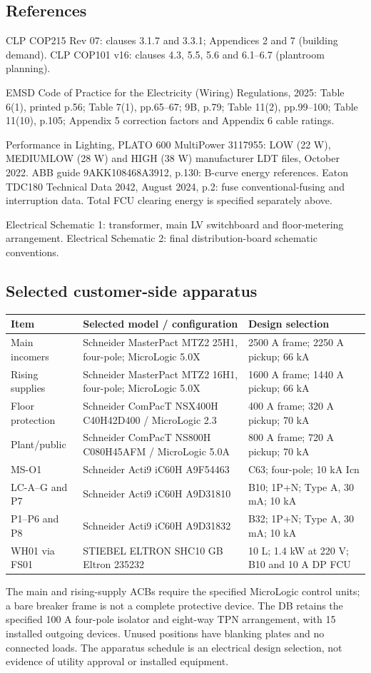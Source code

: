 \subsection*{References}
CLP COP215 Rev 07: clauses 3.1.7 and 3.3.1; Appendices 2 and 7 (building demand). CLP COP101 v16: clauses 4.3, 5.5, 5.6 and 6.1--6.7 (plantroom planning).

EMSD Code of Practice for the Electricity (Wiring) Regulations, 2025: Table 6(1), printed p.56; Table 7(1), pp.65--67; 9B, p.79; Table 11(2), pp.99--100; Table 11(10), p.105; Appendix 5 correction factors and Appendix 6 cable ratings.

Performance in Lighting, PLATO 600 MultiPower 3117955: LOW (22 W), MEDIUMLOW (28 W) and HIGH (38 W) manufacturer LDT files, October 2022. ABB guide 9AKK108468A3912, p.130: B-curve energy references. Eaton TDC180 Technical Data 2042, August 2024, p.2: fuse conventional-fusing and interruption data. Total FCU clearing energy is specified separately above.

\noindent Electrical Schematic 1: transformer, main LV switchboard and floor-metering arrangement. Electrical Schematic 2: final distribution-board schematic conventions.


\clearpage
\subsection*{Selected customer-side apparatus}
\begin{longtable}{p{.19\linewidth}p{.42\linewidth}p{.31\linewidth}}\toprule
Item & Selected model / configuration & Design selection\\\midrule\endhead
Main incomers & Schneider MasterPact MTZ2 25H1, four-pole; MicroLogic 5.0X & 2500 A frame; 2250 A pickup; 66 kA\\
Rising supplies & Schneider MasterPact MTZ2 16H1, four-pole; MicroLogic 5.0X & 1600 A frame; 1440 A pickup; 66 kA\\
Floor protection & Schneider ComPacT NSX400H C40H42D400 / MicroLogic 2.3 & 400 A frame; 320 A pickup; 70 kA\\
Plant/public & Schneider ComPacT NS800H C080H45AFM / MicroLogic 5.0A & 800 A frame; 720 A pickup; 70 kA\\
MS-O1 & Schneider Acti9 iC60H A9F54463 & C63; four-pole; 10 kA Icn\\
LC-A--G and P7 & Schneider Acti9 iC60H A9D31810 & B10; 1P+N; Type A, 30 mA; 10 kA\\
P1--P6 and P8 & Schneider Acti9 iC60H A9D31832 & B32; 1P+N; Type A, 30 mA; 10 kA\\
WH01 via FS01 & STIEBEL ELTRON SHC10 GB Eltron 235232 & 10 L; 1.4 kW at 220 V; B10 and 10 A DP FCU\\
\bottomrule\end{longtable}
The main and rising-supply ACBs require the specified MicroLogic control units; a bare breaker frame is not a complete protective device. The DB retains the specified 100 A four-pole isolator and eight-way TPN arrangement, with 15 installed outgoing devices. Unused positions have blanking plates and no connected loads. The apparatus schedule is an electrical design selection, not evidence of utility approval or installed equipment.

